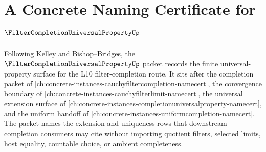 \chapter{A Concrete Naming Certificate for $\FilterCompletionUniversalPropertyUp$}
\label{ch:concrete-instances-filter-completion-universal-property-namecert}

Following Kelley and Bishop--Bridges, the $\FilterCompletionUniversalPropertyUp$ packet records the finite universal-property surface for the L10 filter-completion route. It sits after the completion packet of \autoref{ch:concrete-instances-cauchyfiltercompletion-namecert}, the convergence boundary of \autoref{ch:concrete-instances-cauchyfilterlimit-namecert}, the universal extension surface of \autoref{ch:concrete-instances-completionuniversalproperty-namecert}, and the uniform handoff of \autoref{ch:concrete-instances-uniformcompletion-namecert}. The packet names the extension and uniqueness rows that downstream completion consumers may cite without importing quotient filters, selected limits, host equality, countable choice, or ambient completeness.

